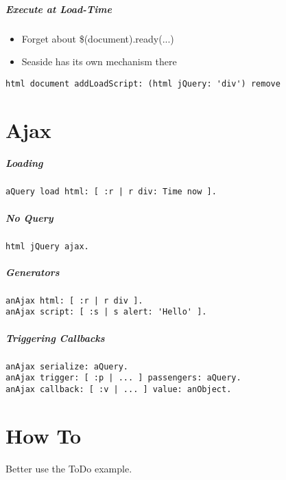 \documentclass[a4paper,10pt,twoside]{book}
\newenvironment{todo}%
	{\obeylines\comment}%
	{\endtrivlist\normalsize}
\begin{document}
\subparagraph*{ Execute at Load-Time}
\label{book:web20:jquery:addingjquery:154255811}
\begin{itemize}
\item  Forget about \$(document).ready(...)
\item  Seaside has its own mechanism there
\end{itemize}

\begin{lstlisting}
html document addLoadScript: (html jQuery: 'div') remove
\end{lstlisting}

\section{Ajax}
\label{book:web20:jquery:ajax}

\subparagraph*{Loading}
\label{book:web20:jquery:ajax:110679257}
\begin{lstlisting}
aQuery load html: [ :r | r div: Time now ].
\end{lstlisting}

\subparagraph*{No Query}
\label{book:web20:jquery:ajax:247359286}
\begin{lstlisting}
html jQuery ajax.
\end{lstlisting}

\subparagraph*{Generators}
\label{book:web20:jquery:ajax:237401841}
\begin{lstlisting}
anAjax html: [ :r | r div ].
anAjax script: [ :s | s alert: 'Hello' ].
\end{lstlisting}

\subparagraph*{Triggering Callbacks}
\label{book:web20:jquery:ajax:86932385}
\begin{lstlisting}
anAjax serialize: aQuery.
anAjax trigger: [ :p | ... ] passengers: aQuery.
anAjax callback: [ :v | ... ] value: anObject.
\end{lstlisting}

\section{How To}
\label{book:web20:jquery:howto}

\begin{todo}
Better use the ToDo example.

\end{todo}
\end{document}
